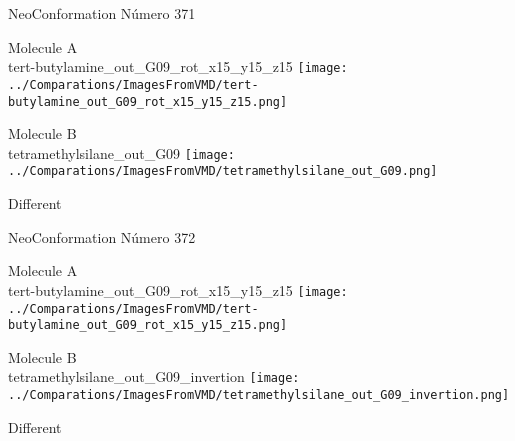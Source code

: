  \newpage

\vtab[-2cm]
\begin{center}
{\large NeoConformation \tab Número 371}
\end{center}
\begin{multicols}{2}
\begin{center}
Molecule A \\ 
tert-butylamine\_out\_G09\_rot\_x15\_y15\_z15
\texttt{[image: ../Comparations/ImagesFromVMD/tert-butylamine\_out\_G09\_rot\_x15\_y15\_z15.png]}
\\
\vtab

\columnbreak
Molecule B \\ 
tetramethylsilane\_out\_G09
\texttt{[image: ../Comparations/ImagesFromVMD/tetramethylsilane\_out\_G09.png]}
\\
\vtab


\end{center}
\end{multicols}
\begin{center}
\vtab
\vtab
\textcolor{NavyBlue}{\Large Different}
\end{center}

 \newpage

\vtab[-2cm]
\begin{center}
{\large NeoConformation \tab Número 372}
\end{center}
\begin{multicols}{2}
\begin{center}
Molecule A \\ 
tert-butylamine\_out\_G09\_rot\_x15\_y15\_z15
\texttt{[image: ../Comparations/ImagesFromVMD/tert-butylamine\_out\_G09\_rot\_x15\_y15\_z15.png]}
\\
\vtab

\columnbreak
Molecule B \\ 
tetramethylsilane\_out\_G09\_invertion
\texttt{[image: ../Comparations/ImagesFromVMD/tetramethylsilane\_out\_G09\_invertion.png]}
\\
\vtab


\end{center}
\end{multicols}
\begin{center}
\vtab
\vtab
\textcolor{NavyBlue}{\Large Different}
\end{center}

 \newpage

